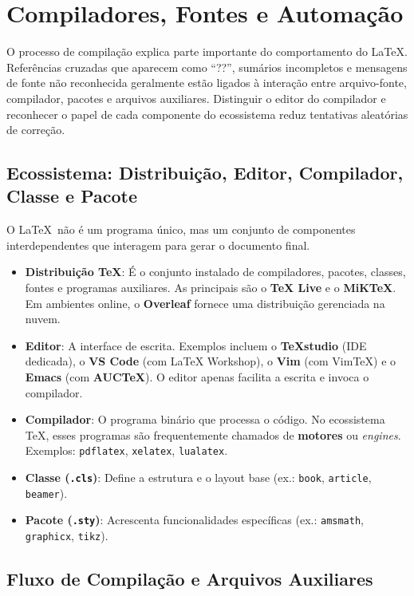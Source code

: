 \chapter{Compiladores, Fontes e Automação}

O processo de compilação explica parte importante do comportamento do \LaTeX. Referências cruzadas que aparecem como ``??'', sumários incompletos e mensagens de fonte não reconhecida geralmente estão ligados à interação entre arquivo-fonte, compilador, pacotes e arquivos auxiliares. Distinguir o editor do compilador e reconhecer o papel de cada componente do ecossistema reduz tentativas aleatórias de correção.

\section{Ecossistema: Distribuição, Editor, Compilador, Classe e Pacote}

O \LaTeX\ não é um programa único, mas um conjunto de componentes interdependentes que interagem para gerar o documento final.

\begin{itemize}
    \item \textbf{Distribuição TeX}: É o conjunto instalado de compiladores, pacotes, classes, fontes e programas auxiliares. As principais são o \textbf{TeX Live} e o \textbf{MiKTeX}. Em ambientes online, o \textbf{Overleaf} fornece uma distribuição gerenciada na nuvem.
    \item \textbf{Editor}: A interface de escrita. Exemplos incluem o \textbf{TeXstudio} (IDE dedicada), o \textbf{VS Code} (com LaTeX Workshop), o \textbf{Vim} (com VimTeX) e o \textbf{Emacs} (com \textbf{AUCTeX}). O editor apenas facilita a escrita e invoca o compilador.
    \item \textbf{Compilador}: O programa binário que processa o código. No ecossistema TeX, esses programas são frequentemente chamados de \textbf{motores} ou \textit{engines}. Exemplos: \texttt{pdflatex}, \texttt{xelatex}, \texttt{lualatex}.
    \item \textbf{Classe (\texttt{.cls})}: Define a estrutura e o layout base (ex.: \texttt{book}, \texttt{article}, \texttt{beamer}).
    \item \textbf{Pacote (\texttt{.sty})}: Acrescenta funcionalidades específicas (ex.: \texttt{amsmath}, \texttt{graphicx}, \texttt{tikz}).
\end{itemize}

\section{Fluxo de Compilação e Arquivos Auxiliares}

